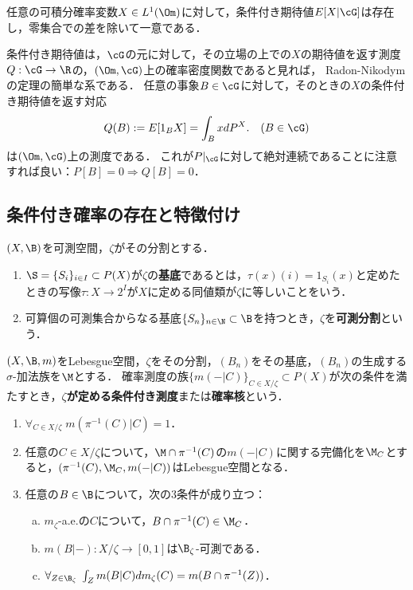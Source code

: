 \documentclass[uplatex,dvipdfmx]{jsreport}
\begin{document}
\begin{corollary}[存在と一意性]
    任意の可積分確率変数$X\in L^1(\Om)$に対して，条件付き期待値$E[X|\cG]$は存在し，零集合での差を除いて一意である．
\end{corollary}
\begin{Proof}
    条件付き期待値は，$\cG$の元に対して，その立場の上での$X$の期待値を返す測度$Q:\cG\to\R$の，$(\Om,\cG)$上の確率密度関数であると見れば，
    Radon-Nikodymの定理の簡単な系である．
    任意の事象$B\in\cG$に対して，そのときの$X$の条件付き期待値を返す対応
    \[Q(B):=E[1_BX]=\int_BxdP^X.\quad(B\in\cG)\]
    は$(\Om,\cG)$上の測度である．
    これが$P|_{\cG}$に対して絶対連続であることに注意すれば良い：$P[B]=0\Rightarrow Q[B]=0$．
\end{Proof}

\subsection{条件付き確率の存在と特徴付け}

\begin{definition}
    $(X,\B)$を可測空間，$\zeta$がその分割とする．
    \begin{enumerate}
        \item $\S=\{S_i\}_{i\in I}\subset P(X)$が$\zeta$の\textbf{基底}であるとは，$\tau(x)(i)=1_{S_i}(x)$と定めたときの写像$\tau:X\to 2^I$が$X$に定める同値類が$\zeta$に等しいことをいう．
        \item 可算個の可測集合からなる基底$\{S_n\}_{n\in\N}\subset\B$を持つとき，$\zeta$を\textbf{可測分割}という．
    \end{enumerate}
\end{definition}

\begin{definition}
    $(X,\B,m)$をLebesgue空間，$\zeta$をその分割，$(B_n)$をその基底，$(B_n)$の生成する$\sigma$-加法族を$\M$とする．
    確率測度の族$\{m(-|C)\}_{C\in X/\zeta}\subset P(X)$が次の条件を満たすとき，\textbf{$\zeta$が定める条件付き測度}または\textbf{確率核}という．
    \begin{enumerate}
        \item $\forall_{C\in X/\zeta}\;m(\pi^{-1}(C)|C)=1$．
        \item 任意の$C\in X/\zeta$について，$\M\cap\pi^{-1}(C)$の$m(-|C)$に関する完備化を$\M_C$とすると，$(\pi^{-1}(C),\M_C,m(-|C))$はLebesgue空間となる．
        \item 任意の$B\in\B$について，次の3条件が成り立つ：
        \begin{enumerate}[(a)]
            \item $m_\zeta$-a.e.の$C$について，$B\cap\pi^{-1}(C)\in\M_C$．
            \item $m(B|-):X/\zeta\to[0,1]$は$\B_\zeta$-可測である．
            \item $\forall_{Z\in\B_\zeta}\;\int_Zm(B|C)dm_\zeta(C)=m(B\cap\pi^{-1}(Z))$．
        \end{enumerate}
    \end{enumerate}
\end{definition}
\end{document}
